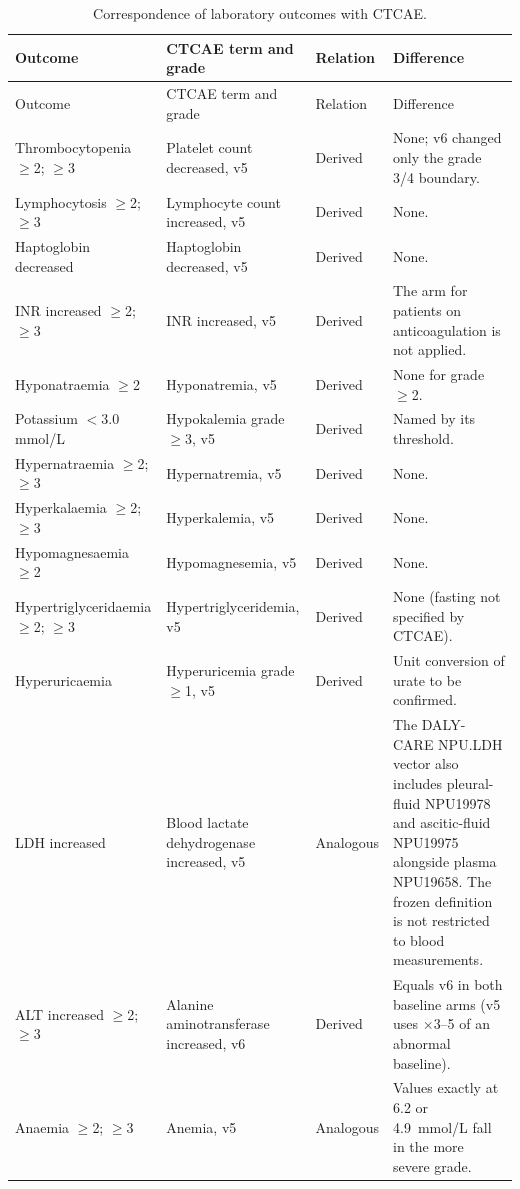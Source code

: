 \documentclass[10pt]{article}
\begin{document}
{\footnotesize\setlength{\tabcolsep}{3pt}
\begin{longtable}{L{3.4cm}L{3.6cm}L{1.7cm}L{6.4cm}}
\caption{Correspondence of laboratory outcomes with CTCAE.}\label{tab:ctcae}\\
\toprule{}
Outcome & CTCAE term and grade & Relation & Difference\\\midrule\endfirsthead
\toprule{}
Outcome & CTCAE term and grade & Relation & Difference\\\midrule\endhead
\bottomrule\endfoot
Thrombocytopenia $\ge$2; $\ge$3 & Platelet count decreased, v5 & Derived & None; v6 changed only the grade 3/4 boundary. \\
Lymphocytosis $\ge$2; $\ge$3 & Lymphocyte count increased, v5 & Derived & None. \\
Haptoglobin decreased & Haptoglobin decreased, v5 & Derived & None. \\
INR increased $\ge$2; $\ge$3 & INR increased, v5 & Derived & The arm for patients on anticoagulation is not applied. \\
Hyponatraemia $\ge$2 & Hyponatremia, v5 & Derived & None for grade $\ge$2. \\
Potassium $<$3.0 mmol/L & Hypokalemia grade $\ge$3, v5 & Derived & Named by its threshold. \\
Hypernatraemia $\ge$2; $\ge$3 & Hypernatremia, v5 & Derived & None. \\
Hyperkalaemia $\ge$2; $\ge$3 & Hyperkalemia, v5 & Derived & None. \\
Hypomagnesaemia $\ge$2 & Hypomagnesemia, v5 & Derived & None. \\
Hypertriglyceridaemia $\ge$2; $\ge$3 & Hypertriglyceridemia, v5 & Derived & None (fasting not specified by CTCAE). \\
Hyperuricaemia & Hyperuricemia grade $\ge$1, v5 & Derived & Unit conversion of urate to be confirmed. \\
LDH increased & Blood lactate dehydrogenase increased, v5 & Analogous & The DALY-CARE NPU.LDH vector also includes pleural-fluid NPU19978 and ascitic-fluid NPU19975 alongside plasma NPU19658. The frozen definition is not restricted to blood measurements. \\
ALT increased $\ge$2; $\ge$3 & Alanine aminotransferase increased, v6 & Derived & Equals v6 in both baseline arms (v5 uses $\times$3--5 of an abnormal baseline). \\
Anaemia $\ge$2; $\ge$3 & Anemia, v5 & Analogous & Values exactly at 6.2 or 4.9~mmol/L fall in the more severe grade. \\

\end{longtable}}
\end{document}
